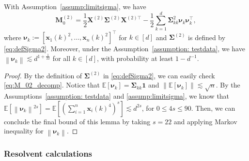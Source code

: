 \documentclass[twoside,11pt]{article}
\newcommand{\norm}[1]{\left\|#1\right\|}
\newcommand{\E}{\mathbb{E}}
\def\bX{{\boldsymbol X}}
\def\bM{{\boldsymbol M}}
\def\bx{{\boldsymbol x}}
\def\bSigma{{\boldsymbol \Sigma}}
\newcommand{\vnu}{\mbi{\nu}}
\newcommand{\1}{\mathbf{1}}
\def\mbi#1{\boldsymbol{#1}}
\def\mbi#1{\boldsymbol{#1}} %
\begin{document}
\begin{lemma}\label{lemm:M_02_decomp}
With Assumption~\ref{assump:limitsigma}, we have
\begin{equation}\label{eq:M_02_decomp}
    \bM_0^{(2)}=\frac{1}{2}\bX^{(2)}\bSigma^{(2)}\bX^{(2)\top}-\frac{1}{2}\sum_{k=1}^d\bSigma_{kk}^2\vnu_k\vnu_k^\top,
\end{equation}
where $\vnu_k:=[\bx_1(k)^2,\ldots,\bx_n(k)^2]^\top$ for $k\in [d]$ and $\bSigma^{(2)}$ is defined by \eqref{eq:defSigma2}. Moreover, under the Assumption~\ref{assumption: testdata}, we have
$\norm{\vnu_k}\lesssim d^{1+\frac{1}{22}}$ for all $k\in[d]$, with probability at least $1-d^{-1}$. 
\end{lemma}
\begin{proof}
  By the definition of $\bSigma^{(2)}$ in \eqref{eq:defSigma2}, we can easily check \eqref{eq:M_02_decomp}. Notice that $\E[\vnu_k]=\bSigma_{kk}\1$ and $\norm{\E[\vnu_k]}\lesssim \sqrt{n}$. By the Assumptions~\ref{assumption: testdata} and \ref{assump:limitsigma}, we know that 
  $
      \E[\norm{\vnu_k}^{2s}]= \E[(\sum_{i=1}^n{\bx_{i}(k)^4})^s]\lesssim d^{2s}$, for $0\le 4s\le 90$. Then, we can conclude the final bound of this lemma by taking $s=22$ and applying Markov inequality for $\norm{\vnu_k}$.
\end{proof}


\subsubsection{Resolvent calculations}\label{sec:resolvent_calc}
\end{document}
